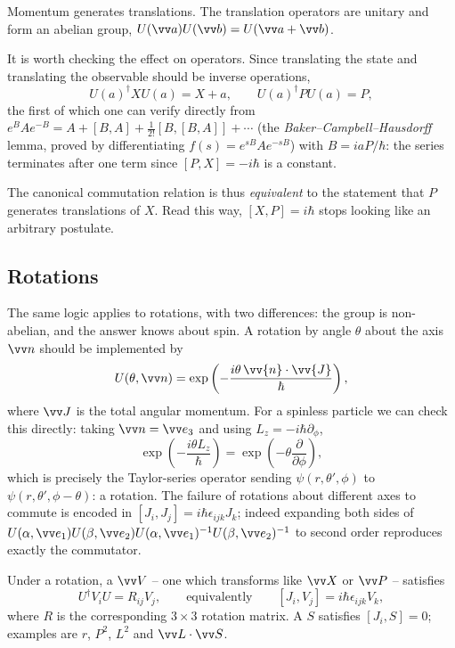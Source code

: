 \begin{proposition}
    Momentum generates translations. The translation operators are unitary and form an abelian group, $U(\vv a) U(\vv b) = U(\vv a + \vv b)$.
\end{proposition}

It is worth checking the effect on operators. Since translating the state and translating the observable should be inverse operations,
$$
U(a)^\dagger X U(a) = X + a, \qquad U(a)^\dagger P U(a) = P,
$$
the first of which one can verify directly from $e^{B}Ae^{-B} = A + [B,A] + \frac{1}{2!}[B,[B,A]]+\cdots$ (the \emph{Baker--Campbell--Hausdorff} lemma, proved by differentiating $f(s) = e^{sB}Ae^{-sB}$) with $B = iaP/\hbar$: the series terminates after one term since $[P, X] = -i\hbar$ is a constant.

\begin{remark}
    The canonical commutation relation is thus \emph{equivalent} to the statement that $P$ generates translations of $X$. Read this way, $[X,P] = i\hbar$ stops looking like an arbitrary postulate.
\end{remark}

\subsection{Rotations}

The same logic applies to rotations, with two differences: the group is non-abelian, and the answer knows about spin. A rotation by angle $\theta$ about the axis $\vv n$ should be implemented by
$$
U(\theta, \vv n) = \exp\left( -\frac{i \theta \, \vv{n}\cdot\vv{J}}{\hbar} \right),
$$
where $\vv J$ is the total angular momentum. For a spinless particle we can check this directly: taking $\vv n = \vv e_3$ and using $L_z = -i\hbar\partial_\phi$,
$$
\exp\left( -\frac{i\theta L_z}{\hbar} \right) = \exp\left( -\theta \frac{\partial}{\partial \phi} \right),
$$
which is precisely the Taylor-series operator sending $\psi(r,\theta',\phi)$ to $\psi(r,\theta',\phi - \theta)$: a rotation. The failure of rotations about different axes to commute is encoded in $[J_i,J_j] = i\hbar\epsilon_{ijk}J_k$; indeed expanding both sides of $U(\alpha,\vv e_1)U(\beta, \vv e_2)U(\alpha,\vv e_1)^{-1}U(\beta,\vv e_2)^{-1}$ to second order reproduces exactly the commutator.

Under a rotation, a  $\vv V$ -- one which transforms like $\vv X$ or $\vv P$ -- satisfies
$$
U^\dagger V_i U = R_{ij}V_j, \qquad \text{equivalently} \qquad [J_i, V_j] = i\hbar\epsilon_{ijk}V_k,
$$
where $R$ is the corresponding $3\times3$ rotation matrix. A  $S$ satisfies $[J_i, S] = 0$; examples are $r$, $P^2$, $L^2$ and $\vv L\cdot\vv S$.


